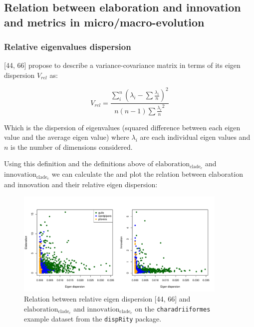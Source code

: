 \documentclass[12pt,a4paper]{article}
\begin{document}
\subsection{Relation between elaboration and innovation and metrics in micro/macro-evolution}

\subsubsection{Relative eigenvalues dispersion}

[44, 66] %
propose to describe a variance-covariance matrix in terms of its eigen dispersion $V_{rel}$ as:

\begin{equation}
V_{rel} = \frac{\sum_{i}^{n}(\lambda_{i} - \sum{\frac{\lambda_{i}}{n}})^2}{n(n-1)\sum{\frac{\lambda_{i}}{n}}^2}
\end{equation}

Which is the dispersion of eigenvalues (squared difference between each eigen value and the average eigen value) where $\lambda_{i}$ are each individual eigen values and $n$ is the number of dimensions considered.

Using this definition and the definitions above of $\text{elaboration}_{\text{clade}_{c}}$ and $\text{innovation}_{\text{clade}_{c}}$ we can calculate the and plot the relation between elaboration and innovation and their relative eigen dispersion:

\begin{figure}[H]
\centering
   \includegraphics[width=0.9\textwidth]{Figures/elaboration_innovation_dispersion.pdf}
\caption{Relation between relative eigen dispersion [44, 66] %
and $\text{elaboration}_{\text{clade}_{c}}$ and $\text{innovation}_{\text{clade}_{c}}$ on the \texttt{charadriiformes} example dataset from the \texttt{dispRity} package.}
\label{Fig:eigen_dispersion}
\end{figure}
\end{document}

